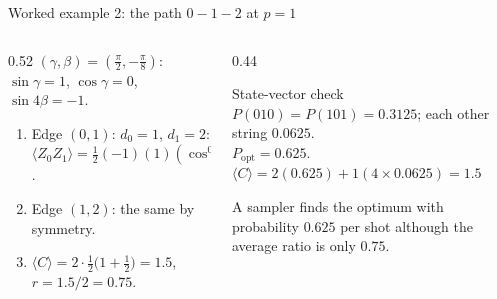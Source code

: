 \documentclass[aspectratio=169,11pt]{beamer}
\begin{document}
\begin{frame}{Worked example 2: the path $0 - 1 - 2$ at $p = 1$}
  \begin{columns}[T]
    \begin{column}{0.52\textwidth}
      $(\gamma, \beta) = (\frac\pi2, -\frac\pi8)$: $\sin\gamma = 1$, $\cos\gamma = 0$, $\sin4\beta = -1$.
      \begin{enumerate}
        \item Edge $(0,1)$: $d_0 = 1$, $d_1 = 2$:\\ $\langle Z_0Z_1\rangle = \frac12(-1)(1)(\cos^0\gamma + \cos^1\gamma) = \frac12(-1)(1 + 0) = -\frac12$.
        \item Edge $(1,2)$: the same by symmetry.
        \item $\langle C\rangle = 2\cdot\frac12\big(1 + \frac12\big) = 1.5$, \ $r = 1.5/2 = 0.75$.
      \end{enumerate}
    \end{column}
    \begin{column}{0.44\textwidth}
      \begin{exampleblock}{State-vector check}
        $P(010) = P(101) = 0.3125$; each other string $0.0625$.\\
        $P_{\text{opt}} = 0.625$.\\
        $\langle C\rangle = 2(0.625) + 1(4\times0.0625) = 1.5$ \checkmark
      \end{exampleblock}
      \small A sampler finds the optimum with probability $0.625$ per shot although the average ratio is only $0.75$.
    \end{column}
  \end{columns}
\end{frame}
\end{document}
